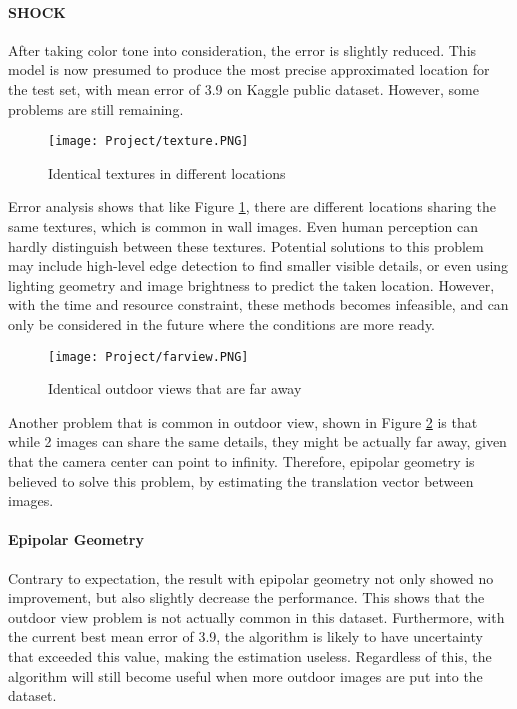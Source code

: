 \documentclass[11pt]{article}
\begin{document}
\begin{multicols}{2}
\paragraph{SHOCK} After taking color tone into consideration, the error is slightly reduced. This model is now presumed to produce the most precise approximated location for the test set, with mean error of 3.9 on Kaggle public dataset. However, some problems are still remaining.
\begin{figure}[H]
    \centering
    \texttt{[image: Project/texture.PNG]}
    \caption{Identical textures in different locations}
    \label{fig:texture}
\end{figure}
\noindent Error analysis shows that like Figure \ref{fig:texture}, there are different locations sharing the same textures, which is common in wall images. Even human perception can hardly distinguish between these textures. Potential solutions to this problem may include high-level edge detection to find smaller visible details, or even using lighting geometry and image brightness to predict the taken location. However, with the time and resource constraint, these methods becomes infeasible, and can only be considered in the future where the conditions are more ready.

\begin{figure}[H]
    \centering
    \texttt{[image: Project/farview.PNG]}
    \caption{Identical outdoor views that are far away}
    \label{fig:far}
\end{figure}
\noindent Another problem that is common in outdoor view, shown in Figure \ref{fig:far} is that while 2 images can share the same details, they might be actually far away, given that the camera center can point to infinity. Therefore, epipolar geometry is believed to solve this problem, by estimating the translation vector between images.

\paragraph{Epipolar Geometry} Contrary to expectation, the result with epipolar geometry not only showed no improvement, but also slightly decrease the performance. This shows that the outdoor view problem is not actually common in this dataset. Furthermore, with the current best mean error of 3.9, the algorithm is likely to have uncertainty that exceeded this value, making the estimation useless. Regardless of this, the algorithm will still become useful when more outdoor images are put into the dataset.


\end{multicols}
\end{document}
